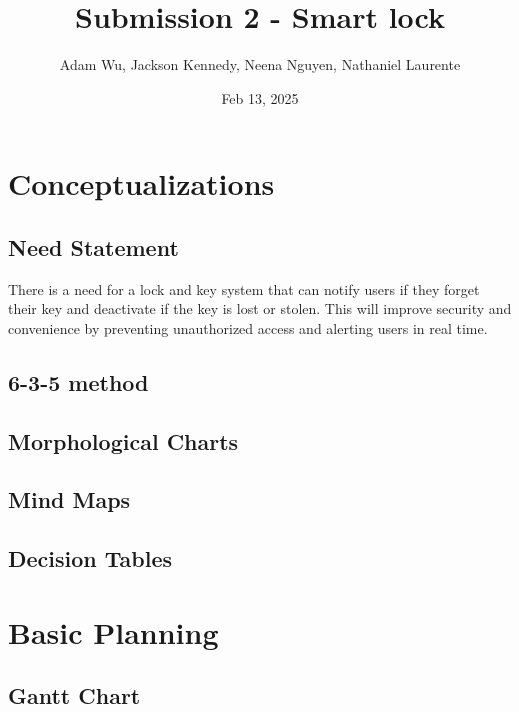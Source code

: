 \documentclass{article}
\title{Submission 2 - Smart lock} %
\author{Adam Wu, Jackson Kennedy, Neena Nguyen, Nathaniel Laurente}
\date{Feb 13, 2025}
\begin{document}
\maketitle

\tableofcontents
\newpage

\section{Conceptualizations}
\subsection{Need Statement}
There is a need for a lock and key system that can notify users if they forget their key and deactivate if the key is lost or stolen. This will improve security and convenience by preventing unauthorized access and alerting users in real time.


\subsection{6-3-5 method}

\subsection{Morphological Charts}

\subsection{Mind Maps}

\subsection{Decision Tables}


\section{Basic Planning}
\subsection{Gantt Chart}
\end{document}
